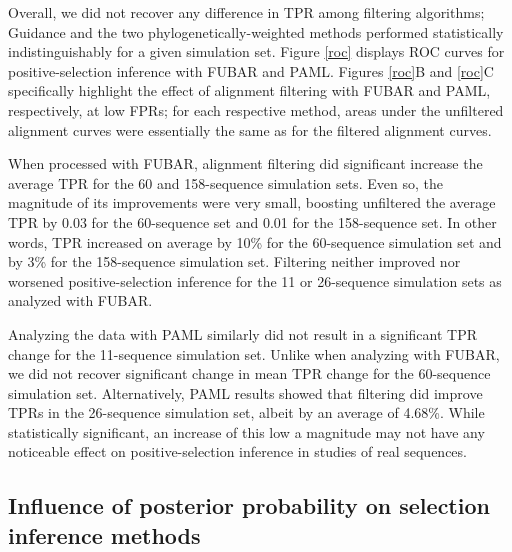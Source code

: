\documentclass[10pt]{article}
\begin{document}
Overall, we did not recover any difference in TPR among filtering algorithms; Guidance and the two phylogenetically-weighted methods performed statistically indistinguishably for a given simulation set. Figure \ref{roc} displays ROC curves for positive-selection inference with FUBAR and PAML. Figures \ref{roc}B and \ref{roc}C specifically highlight the effect of alignment filtering with FUBAR and PAML, respectively, at low FPRs; for each respective method, areas under the unfiltered alignment curves were essentially the same as for the filtered alignment curves.

When processed with FUBAR, alignment filtering did significant increase the average TPR for the 60 and 158-sequence simulation sets. Even so, the magnitude of its improvements were very small, boosting unfiltered the average TPR by 0.03 for the 60-sequence set and 0.01 for the 158-sequence set. In other words, TPR increased on average by 10\% for the 60-sequence simulation set and by 3\% for the 158-sequence simulation set. Filtering neither improved nor worsened positive-selection inference for the 11 or 26-sequence simulation sets as analyzed with FUBAR.

Analyzing the data with PAML similarly did not result in a significant TPR change for the 11-sequence simulation set. Unlike when analyzing with FUBAR, we did not recover significant change in mean TPR change for the 60-sequence simulation set. Alternatively, PAML results showed that filtering did improve TPRs in the 26-sequence simulation set, albeit by an average of 4.68\%. While statistically significant, an increase of this low a magnitude may not have any noticeable effect on positive-selection inference in studies of real sequences. 

\subsection*{Influence of posterior probability on selection inference methods}
\end{document}
